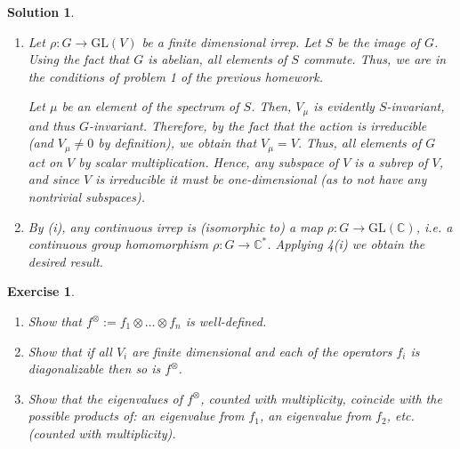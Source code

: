 \documentclass{article}
\newtheorem{ex}{Exercise}
\theoremstyle{nonumberplain}
\newtheorem{sol}{Solution}
\newcommand{\C}{\mathbb{C}}
\newcommand{\GL}{\mathrm{GL}}
\begin{document}
\begin{sol}\leavevmode
\begin{enumerate}
\item Let $\rho \colon G \to \GL(V)$ be a finite dimensional irrep. Let $S$ be the image of $G$. Using the fact that $G$ is abelian, all elements of $S$ commute. Thus, we are in the conditions of problem 1 of the previous homework.

Let $\mu$ be an element of the spectrum of $S$. Then, $V_\mu$ is evidently $S$-invariant, and thus $G$-invariant. Therefore, by the fact that the action is irreducible (and $V_\mu \neq 0$ by definition), we obtain that $V_\mu = V$. Thus, all elements of $G$ act on $V$ by scalar multiplication. Hence, any subspace of $V$ is a subrep of $V$, and since $V$ is irreducible it must be one-dimensional (as to not have any nontrivial subspaces). 

\item By (i), any continuous irrep is (isomorphic to) a map $\rho \colon G \to \GL(\C)$, i.e. a continuous group homomorphism $\rho \colon G \to \C^*$. Applying 4(i) we obtain the desired result.
\end{enumerate}
\end{sol}

\begin{ex}\leavevmode
\begin{enumerate}
\item Show that $f^\otimes := f_1 \otimes \dots \otimes f_n$ is well-defined.
\item Show that if all $V_i$ are finite dimensional and each of the operators $f_i$ is diagonalizable then so is $f^\otimes$.
\item Show that the eigenvalues of $f^\otimes$, counted with multiplicity, coincide with the possible products of: an eigenvalue from $f_1$, an eigenvalue from $f_2$, etc. (counted with multiplicity).
\end{enumerate}
\end{ex}
\end{document}
